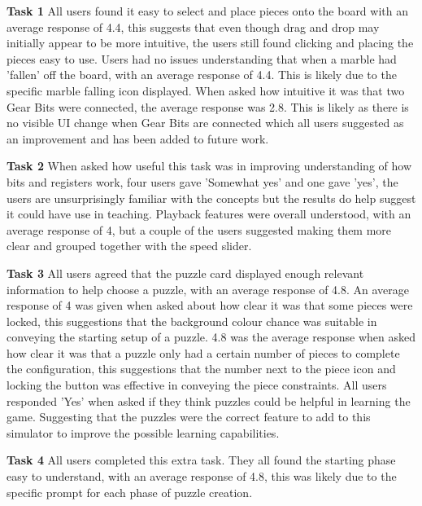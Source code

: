 \documentclass{l4proj}
\begin{document}
\textbf{Task 1}
All users found it easy to select and place pieces onto the board with an average response of 4.4, this suggests that even though drag and drop may initially appear to be more intuitive, the users still found clicking and placing the pieces easy to use. Users had no issues understanding that when a marble had 'fallen' off the board, with an average response of 4.4. This is likely due to the specific marble falling icon displayed. When asked how intuitive it was that two Gear Bits were connected, the average response was 2.8. This is likely as there is no visible UI change when Gear Bits are connected which all users suggested as an improvement and has been added to future work. 

\textbf{Task 2}
When asked how useful this task was in improving understanding of how bits and registers work, four users gave 'Somewhat yes' and one gave 'yes', the users are unsurprisingly familiar with the concepts but the results do help suggest it could have use in teaching. Playback features were overall understood, with an average response of 4, but a couple of the users suggested making them more clear and grouped together with the speed slider. 

\textbf{Task 3}
All users agreed that the puzzle card displayed enough relevant information to help choose a puzzle, with an average response of 4.8. An average response of 4 was given when asked about how clear it was that some pieces were locked, this suggestions that the background colour chance was suitable in conveying the starting setup of a puzzle. 4.8 was the average response when asked how clear it was that a puzzle only had a certain number of pieces to complete the configuration, this suggestions that the number next to the piece icon and locking the button was effective in conveying the piece constraints. All users responded 'Yes' when asked if they think puzzles could be helpful in learning the game. Suggesting that the puzzles were the correct feature to add to this simulator to improve the possible learning capabilities.

\textbf{Task 4}
All users completed this extra task. They all found the starting phase easy to understand, with an average response of 4.8, this was likely due to the specific prompt for each phase of puzzle creation.  
\end{document}
